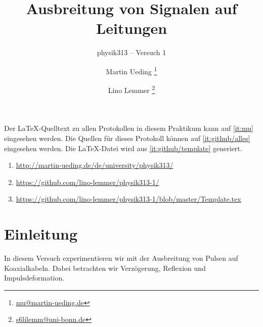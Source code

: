 


\usepackage{placeins}



\subject{Praktikumsprotokoll}
\title{Ausbreitung von Signalen auf Leitungen}
\subtitle{physik313 – Versuch 1}
\author{
	Martin Ueding \footnote{\href{mailto:mu@martin-ueding.de}{mu@martin-ueding.de}}
	\and
	Lino Lemmer \footnote{\href{mailto:s6lilemm@uni-bonn.de}{s6lilemm@uni-bonn.de}}
}
\publishers{Gruppe 3 -- A -- Tutor: Christoph Brezina}




\maketitle

Der \LaTeX-Quelltext zu allen Protokollen in diesem Praktikum kann auf
\ref{it:mu} eingesehen werden. Die Quellen für dieses Protokoll können auf
\ref{it:github/alles} eingesehen werden. Die \LaTeX-Datei wird aus
\ref{it:github/template} generiert.

\begin{enumerate}
	\item
		\label{it:mu}
		\url{http://martin-ueding.de/de/university/physik313/}
	\item
		\label{it:github/alles}
		\url{https://github.com/lino-lemmer/physik313-1/}
	\item
		\label{it:github/template}
		\url{https://github.com/lino-lemmer/physik313-1/blob/master/Template.tex}
\end{enumerate}

\newpage
\tableofcontents
\newpage


\section{Einleitung}

In diesem Versuch experimentieren wir mit der Ausbreitung von Pulsen auf
Koaxialkabeln. Dabei betrachten wir Verzögerung, Reflexion und
Impulsdeformation.

